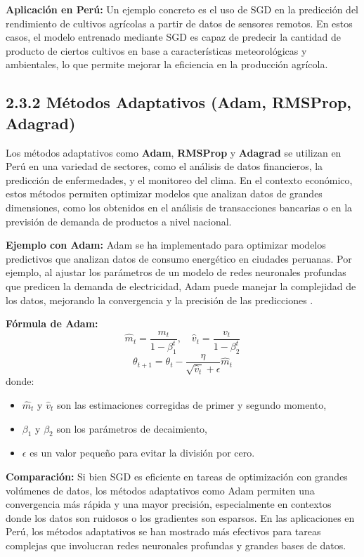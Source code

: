 \documentclass[12pt]{article}
\begin{document}
\textbf{Aplicación en Perú:}
Un ejemplo concreto es el uso de SGD en la predicción del rendimiento de cultivos agrícolas a partir de datos de sensores remotos. En estos casos, el modelo entrenado mediante SGD es capaz de predecir la cantidad de producto de ciertos cultivos en base a características meteorológicas y ambientales, lo que permite mejorar la eficiencia en la producción agrícola.

\subsection*{2.3.2 Métodos Adaptativos (Adam, RMSProp, Adagrad)}
Los métodos adaptativos como \textbf{Adam}, \textbf{RMSProp} y \textbf{Adagrad} se utilizan en Perú en una variedad de sectores, como el análisis de datos financieros, la predicción de enfermedades, y el monitoreo del clima. En el contexto económico, estos métodos permiten optimizar modelos que analizan datos de grandes dimensiones, como los obtenidos en el análisis de transacciones bancarias o en la previsión de demanda de productos a nivel nacional.

\textbf{Ejemplo con Adam:}
Adam se ha implementado para optimizar modelos predictivos que analizan datos de consumo energético en ciudades peruanas. Por ejemplo, al ajustar los parámetros de un modelo de redes neuronales profundas que predicen la demanda de electricidad, Adam puede manejar la complejidad de los datos, mejorando la convergencia y la precisión de las predicciones \cite{Kingma2015}.

\textbf{Fórmula de Adam:}
\[
\hat{m}_t = \frac{m_t}{1 - \beta_1^t}, \quad \hat{v}_t = \frac{v_t}{1 - \beta_2^t}
\]
\[
\theta_{t+1} = \theta_t - \frac{\eta}{\sqrt{\hat{v}_t} + \epsilon} \hat{m}_t
\]
donde:
\begin{itemize}
	\item \(\hat{m}_t\) y \(\hat{v}_t\) son las estimaciones corregidas de primer y segundo momento,
	\item \(\beta_1\) y \(\beta_2\) son los parámetros de decaimiento,
	\item \(\epsilon\) es un valor pequeño para evitar la división por cero.
\end{itemize}

\textbf{Comparación:}
Si bien SGD es eficiente en tareas de optimización con grandes volúmenes de datos, los métodos adaptativos como Adam permiten una convergencia más rápida y una mayor precisión, especialmente en contextos donde los datos son ruidosos o los gradientes son esparsos. En las aplicaciones en Perú, los métodos adaptativos se han mostrado más efectivos para tareas complejas que involucran redes neuronales profundas y grandes bases de datos.
	\newpage
\end{document}

